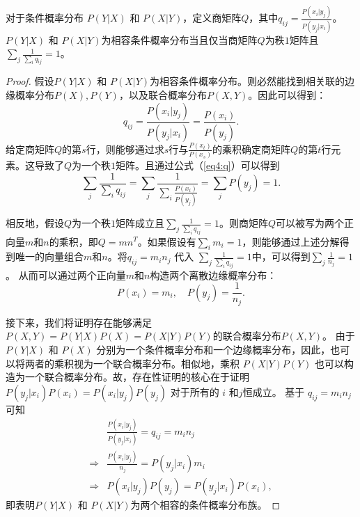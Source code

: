 \begin{theorem}
    \label{thm4}
    对于条件概率分布 $P(Y|X)$ 和 $P(X|Y)$，定义商矩阵$Q$，其中${q}_{ij} = \frac{P(x_i|y_j)}{P(y_j|x_i)}$。$P(Y|X)$ 和 $P(X|Y)$为相容条件概率分布当且仅当商矩阵$Q$为秩$1$矩阵且$\sum_j\frac{1}{\sum_i {q}_{ij}} = 1$。
\end{theorem}
\begin{proof}
    假设$P(Y|X)$ 和 $P(X|Y)$为相容条件概率分布。则必然能找到相关联的边缘概率分布$P(X), P(Y)$，以及联合概率分布$P(X, Y)$。因此可以得到：
    \begin{equation}
    {q}_{ij} = \frac{P(x_i|y_j)}{P(y_j|x_i)} = \frac{P(x_i)}{P(y_j)}.
    \label{eq4:q}
    \end{equation}
    给定商矩阵$Q$的第$s$行，则能够通过求$s$行与$\frac{P(x_t)}{P(x_s)}$的乘积确定商矩阵$Q$的第$t$行元素。这导致了$Q$为一个秩$1$矩阵。且通过公式（\ref{eq4:q}）可以得到
    \begin{equation}
    \sum_j\frac{1}{\sum_i {q}_{ij}} = \sum_j\frac{1}{\sum_i \frac{P(x_i)}{P(y_j)}} = \sum_j P(y_j) = 1.
    \end{equation}

    相反地，假设$Q$为一个秩$1$矩阵成立且$\sum_j\frac{1}{\sum_i {q}_{ij}} = 1$。则商矩阵$Q$可以被写为两个正向量$m$和$n$的乘积，即$Q = mn^T$。如果假设有$\sum_i  {m}_i = 1$，则能够通过上述分解得到唯一的向量组合$m$和$n$。将${q}_{ij} ={ m}_i{n}_j$ 代入 $\sum_j\frac{1}{\sum_i {q}_{ij}} = 1$中，可以得到$\sum_j\frac{1}{{n}_j} = 1$。
    从而可以通过两个正向量$m$和$n$构造两个离散边缘概率分布：
    \begin{equation}
    P(x_i) = {m}_i, \quad P(y_j) = \frac{1}{{n}_j}.
    \end{equation}

    接下来，我们将证明存在能够满足 $P(X, Y) = P(Y|X)P(X) = P(X|Y)P(Y)$的联合概率分布$P(X, Y)$。
    由于$P(Y|X)$ 和 $P(X)$ 分别为一个条件概率分布和一个边缘概率分布，因此，也可以将两者的乘积视为一个联合概率分布。相似地，乘积 $P(X|Y)P(Y)$ 也可以构造为一个联合概率分布。故，存在性证明的核心在于证明 $P(y_j|x_i)P(x_i) = P(x_i|y_j)P(y_j)$ 对于所有的 $i$ 和$j$恒成立。
    基于 ${q}_{ij} = {m}_i{n}_j$可知
    \begin{equation}
    \begin{split}
    &\frac{P(x_i|y_j)}{P(y_j|x_i)} = {q}_{ij} = {m}_i{n}_j\\
    \Rightarrow &\frac{P(x_i|y_j)}{{n}_j} = P(y_j|x_i) {m}_i\\
    \Rightarrow &P(x_i|y_j)P(y_j) = P(y_j|x_i)P(x_i), 
    \end{split}
    \end{equation}
    即表明$P(Y|X)$ 和 $P(X|Y)$为两个相容的条件概率分布族。
\end{proof}

